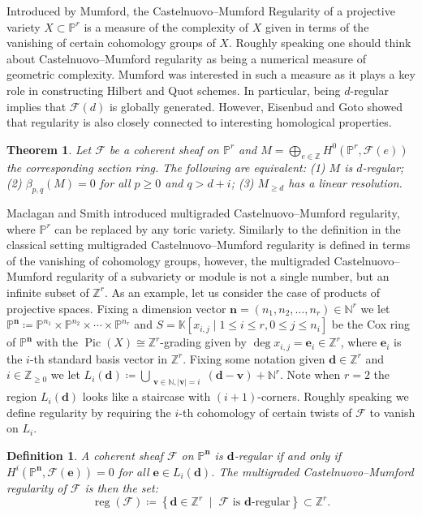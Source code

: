 \documentclass[11pt,reqno]{amsart}
\newtheorem{theorem}[lemma]{Theorem}
\newtheorem{defn}[lemma]{Definition}
\theoremstyle{remark}
\newcommand{\reg}{\operatorname{reg}}
\newcommand{\Pic}{\operatorname{Pic}}
\newcommand{\dd}{\mathbf{d}}
\newcommand{\nn}{\mathbf{n}}
\newcommand{\ee}{\mathbf{e}}
\newcommand{\vv}{\mathbf{v}}
\newcommand{\KK}{\mathbb{K}}
\newcommand{\NN}{\mathbb{N}}
\newcommand{\PP}{\mathbb{P}}
\newcommand{\ZZ}{\mathbb{Z}}
\newcommand{\cF}{\mathcal{F}}
\begin{document}
Introduced by Mumford, the Castelnuovo–Mumford Regularity of a projective variety $X\subset \PP^{r}$ is a measure of the complexity of $X$ given in terms of the vanishing of certain cohomology groups of $X$. Roughly speaking one should think about Castelnuovo--Mumford regularity as being a numerical measure of geometric complexity. Mumford was interested in such a measure as it plays a key role in constructing Hilbert and Quot schemes. In particular, being $d$-regular implies that $\cF(d)$ is globally generated. However, Eisenbud and Goto showed that regularity is also closely connected to interesting homological properties.

\begin{theorem}\cite{eisenbudGoto84}\label{thm:eisenbud-goto}
Let $\cF$ be a coherent sheaf on $\PP^{r}$ and $M=\bigoplus_{e\in\ZZ} H^0(\PP^{r},\cF(e))$ the corresponding section ring. The following are equivalent: (1) $M$ is $d$-regular; (2) $\beta_{p,q}(M)=0$ for all $p\geq0$ and $q>d+i$; (3) $M_{\geq d}$ has a linear resolution. 
\end{theorem}

Maclagan and Smith introduced multigraded Castelnuovo--Mumford regularity, where $\PP^{r}$ can be replaced by any toric variety. Similarly to the definition in the classical setting multigraded Castelnuovo--Mumford regularity is defined in terms of the vanishing of cohomology groups, however, the multigraded Castelnuovo--Mumford regularity of a subvariety or module is not a single number, but an infinite subset of $\ZZ^{r}$. As an example, let us consider the case of products of projective spaces. Fixing a dimension vector $\nn=(n_1,n_2,\ldots,n_{r})\in \NN^{r}$ we let $\PP^{\nn}\coloneqq \PP^{n_1}\times \PP^{n_2}\times \cdots \times \PP^{n_r}$ and $S=\KK[x_{i,j} \; |\; 1\leq i \leq r, 0\leq j \leq n_{i}]$ be the Cox ring of $\PP^{\nn}$ with the $\Pic(X)\cong \ZZ^{r}$-grading given by $\deg x_{i,j} = \ee_{i} \in \ZZ^{r}$, where $\ee_{i}$ is the $i$-th standard basis vector in $\ZZ^{r}$. Fixing some notation given $\dd\in \ZZ^{r}$ and $i\in \ZZ_{\geq0}$ we let $L_{i}(\dd)\coloneqq \bigcup_{\substack{\vv \in \NN, |\vv| = i}} (\dd-\vv)+\NN^{r}$. Note when $r=2$ the region $L_{i}(\dd)$ looks like a staircase with $(i+1)$-corners. Roughly speaking we define regularity by requiring the $i$-th cohomology of certain twists of $\cF$ to vanish on $L_{i}$. 

\begin{defn}\cite[Definition 6.1]{maclaganSmith04}\label{def:mg-reg}
A coherent sheaf $\cF$ on $\PP^{\nn}$ is $\dd$-regular if and only if $H^i\left(\PP^{\nn}, \cF(\ee)\right) =0$ for all $\ee\in L_{i}(\dd)$. The multigraded Castelnuovo--Mumford regularity of $\cF$ is then the set: 
\[
\reg(\cF) \coloneqq \left \{ \dd\in \ZZ^{r} \;\; \big| \;\; \text{$\cF$ is $\dd$-regular}\right\}\subset \ZZ^{r}.
\]
\end{defn}
\end{document}
